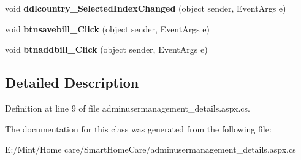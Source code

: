 \begin{DoxyCompactItemize}
\item 
\hypertarget{classadminusermanagement__details_a56eac8232a9166afe8b3c93bab5ae643}{void {\bfseries ddlcountry\-\_\-\-Selected\-Index\-Changed} (object sender, Event\-Args e)}\label{classadminusermanagement__details_a56eac8232a9166afe8b3c93bab5ae643}

\item 
\hypertarget{classadminusermanagement__details_aa7986204975ebb18b38360880c2af6ff}{void {\bfseries btnsavebill\-\_\-\-Click} (object sender, Event\-Args e)}\label{classadminusermanagement__details_aa7986204975ebb18b38360880c2af6ff}

\item 
\hypertarget{classadminusermanagement__details_a9b6c177a36b91a50160cbd382e672f60}{void {\bfseries btnaddbill\-\_\-\-Click} (object sender, Event\-Args e)}\label{classadminusermanagement__details_a9b6c177a36b91a50160cbd382e672f60}

\end{DoxyCompactItemize}


\subsection{Detailed Description}


Definition at line 9 of file adminusermanagement\-\_\-details.\-aspx.\-cs.



The documentation for this class was generated from the following file\-:\begin{DoxyCompactItemize}
\item 
E\-:/\-Mint/\-Home care/\-Smart\-Home\-Care/adminusermanagement\-\_\-details.\-aspx.\-cs\end{DoxyCompactItemize}

